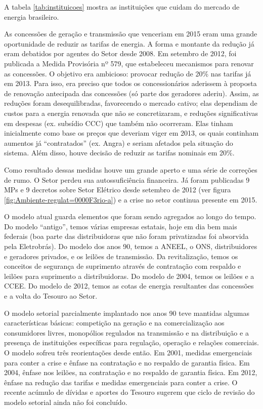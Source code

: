 A tabela \ref{tab:instituicoes} mostra as instituições que cuidam
do mercado de energia brasileiro.

As concessões de geração e transmissão que venceriam em 2015 eram
uma grande oportunidade de reduzir as tarifas de energia. A forma
e montante da redução já eram debatidos por agentes do Setor desde
2008. Em setembro de 2012, foi publicada a Medida Provisória nº 579,
que estabeleceu mecanismos para renovar as concessões. O objetivo
era ambicioso: provocar redução de 20\% nas tarifas já em 2013. Para
isso, era preciso que todos os concessionários aderissem à proposta
de renovação antecipada das concessões (só parte dos geradores aderiu).
Assim, as reduções foram desequilibradas, favorecendo o mercado cativo;
elas dependiam de custos para a energia renovada que não se concretizaram,
e reduções significativas em despesas (ex. subsídio CCC) que também
não ocorreram. Elas tinham inicialmente como base os preços que deveriam
viger em 2013, os quais continham aumentos já \textquotedblleft contratados\textquotedblright{}
(ex. Angra) e seriam afetados pela situação do sistema. Além disso,
houve decisão de reduzir as tarifas nominais em 20\%. 

Como resultado dessas medidas houve um grande aperto e uma série de
correções de rumo. O Setor perdeu sua autossuficiência financeira.
Já foram publicadas 9 MPs e 9 decretos sobre Setor Elétrico desde
setembro de 2012 (ver figura \ref{fig:Ambiente-regulat=0000F3rio-a})
e a crise no setor continua presente em 2015.

O modelo atual guarda elementos que foram sendo agregados ao longo
do tempo. Do modelo \textquotedblleft antigo\textquotedblright , temos
várias empresas estatais, hoje em dia bem mais federais (boa parte
das distribuidoras que não foram privatizadas foi absorvida pela Eletrobrás).
Do modelo dos anos 90, temos a ANEEL, o ONS, distribuidores e geradores
privados, e os leilões de transmissão. Da revitalização, temos os
conceitos de segurança de suprimento através de contratação com respaldo
e leilões para suprimento a distribuidoras. Do modelo de 2004, temos
os leilões e a CCEE. Do modelo de 2012, temos as cotas de energia
resultantes das concessões e a volta do Tesouro ao Setor.

O modelo setorial parcialmente implantado nos anos 90 teve mantidas
algumas características básicas: competição na geração e na comercialização
aos consumidores livres, monopólios regulados na transmissão e na
distribuição e a presença de instituições específicas para regulação,
operação e relações comerciais. O modelo sofreu três reorientações
desde então. Em 2001, medidas emergenciais para conter a crise e ênfase
na contratação e no respaldo de garantia física. Em 2004, ênfase nos
leilões, na contratação e no respaldo de garantia física. Em 2012,
ênfase na redução das tarifas e medidas emergenciais para conter a
crise. O recente acúmulo de dívidas e aportes do Tesouro sugerem que
ciclo de revisão do modelo setorial ainda não foi concluído.
